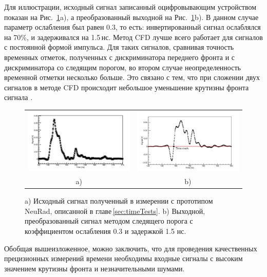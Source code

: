 Для иллюстрации, исходный сигнал записанный оцифровывающим устройством показан на Рис.~\ref{ris:CFDform}a), а преобразованный выходной на Рис.~\ref{ris:CFDform}b).
В данном случае параметр ослабления был равен 0.3, то есть: инвертированный сигнал ослаблялся на 70\%, и задерживался на 1.5\,нс.
Метод CFD лучше всего работает для сигналов с постоянной формой импульса. Для таких сигналов, сравнивая точность временных отметок, полученных с дискриминатора переднего фронта и с дискриминатора со следящим порогом, во втором случае неопределенность временной отметки несколько больше. Это связано с тем, что при сложении двух сигналов в методе CFD происходит небольшое уменьшение крутизны фронта сигнала \cite{dasha}.

\begin{figure}[!h]
	\centering
	\begin{tabular}{cc}
		\includegraphics[width=0.5\linewidth]{originalsignalform.png} & \includegraphics[width=0.5\linewidth]{CFDform.png} \\
		a) & b) \\
	\end{tabular}
	\caption{a) Исходный сигнал полученный в измерении с прототипом NeuRad, описанной в главе\,\ref{sec:timeTests}. b) Выходной, преобразованный сигнал методом следящего порога с коэффициентом ослабления 0.3 и задержкой 1.5 нс.}\label{ris:CFDform}
\end{figure}

Обобщая вышеизложенное, можно заключить, что для проведения качественных прецизионных измерений времени необходимы входные сигналы с высоким значением крутизны фронта и незначительными шумами.



